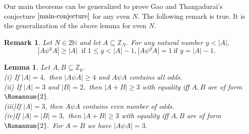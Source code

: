\documentclass[reqno,10pt]{amsart}
\newtheorem{lem}[prop]{ Lemma}
\newtheorem{remar}[prop]{Remark}
\newcommand{\two}{\Romannum {2}}
\begin{document}
Our main theorems can be generalized to prove Gao and Thangadurai's conjecture $\ref{main-conjecture}$  for any even $N.$ The following remark is true. It is the generalization of the above lemma for even $N.$ 
\begin{remar}
\label{lp-sp-global}Let $N \in 2\mathbb{N}$ and let $A\subseteq  \mathbb{Z}_{N}.$ For any natural number $y < |A|,$
$$ | A \psi^y A | \geq |A|  \  \text{ if $1 \leq y < |A|-1$,} \
 | A \psi^y A | = 1 \  \text{if $y = |A|-1.$ }$$ 
\end{remar}
\begin{lem} 
\label{lp}Let $A,B \subseteq  \mathbb{Z}_{6}.$\\
(i) If $ |A|=4,$ then $|A \psi A| \geq 4$ and $A \psi A$ contains all odds.\\
(ii) If $ |A|=3$ and $|B
|=2,$ then $|A+B|\geq 3$ with equality iff $A, B$ are of form $\two.$ \\
(iii)If $|A|=3$, then $A \psi A$ contains even number of odds.\\
(iv)If $|A|=|B|=3,$ then $|A+B| \geq 3$ with equality iff $A,B$ are of form $\two.$ For $A=B$ we have $|A \psi A| = 3.$
\end{lem}
\end{document}
